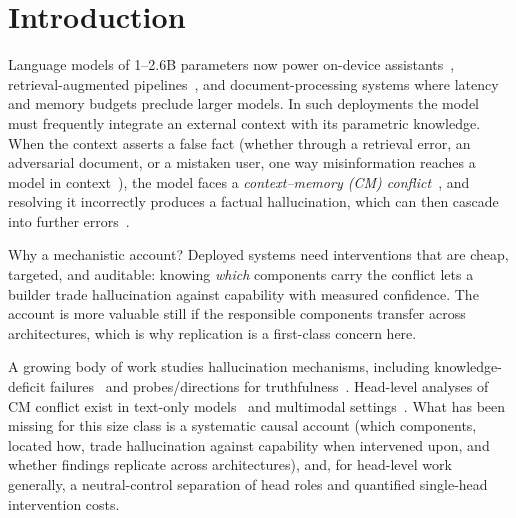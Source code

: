 \documentclass[paper]{ieice}
\begin{document}
\section{Introduction}
\label{sec:intro}


Language models of 1--2.6B parameters now power on-device
assistants~\cite{llama32card}, retrieval-augmented
pipelines~\cite{aromsuk2026rag}, and document-processing systems
where latency and memory budgets preclude larger models. In such deployments the
model must frequently integrate an external context with its parametric
knowledge. When the context asserts a false fact (whether through a retrieval error, an adversarial
document, or a mistaken user, one way misinformation reaches a model
in context~\cite{mishima2022fake}), the model
faces a \emph{context--memory (CM) conflict}~\cite{xu2024knowledge}, and
resolving it incorrectly produces a factual hallucination, which can then cascade into further errors~\cite{zhang2024snowball}.

Why a mechanistic account? Deployed systems need interventions that
are cheap, targeted, and auditable: knowing \emph{which} components
carry the conflict lets a builder trade hallucination against
capability with measured confidence. The account is more valuable still
if the responsible components transfer across architectures, which is
why replication is a first-class concern here.

A growing body of work studies hallucination mechanisms, including
knowledge-deficit failures~\cite{yu2024mechanistic} and
probes/directions for truthfulness~\cite{li2023itti,marks2024geometry}.
Head-level analyses of CM conflict exist in text-only
models~\cite{li2025juice,jin2024ph3} and multimodal
settings~\cite{jiang2026causal}. What has been missing
for this size class is a systematic causal account (which components, located how, trade hallucination
against capability when intervened upon, and whether findings
replicate across architectures), and, for head-level work generally, a neutral-control separation of head roles
and quantified single-head intervention costs.
\end{document}
